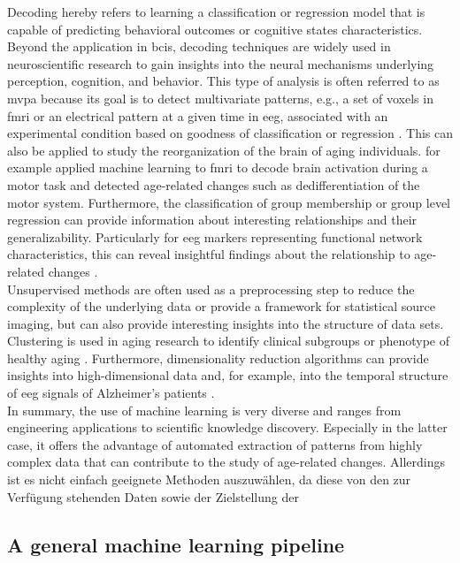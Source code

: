 Decoding hereby refers to learning a classification or regression model that is capable of predicting behavioral outcomes or cognitive states characteristics. Beyond the application in \glspl{bci}, decoding techniques are widely used in neuroscientific research to gain insights into the neural mechanisms underlying perception, cognition, and behavior. This type of analysis is often referred to as \gls{mvpa} because its goal is to detect multivariate patterns, e.g., a set of voxels in \gls{fmri} or an electrical pattern at a given time in \gls{eeg}, associated with an experimental condition based on goodness of classification or regression \cite{Holdgraf2017}. This can also be applied to study the reorganization of the brain of aging individuals. \cite{Carb2011} for example applied machine learning to \gls{fmri} to decode brain activation during a motor task and detected age-related changes such as dedifferentiation of the motor system. Furthermore, the classification of group membership or group level regression can provide information about interesting relationships and their generalizability. Particularly for \gls{eeg} markers representing functional network characteristics, this can reveal insightful findings about the relationship to age-related changes \cite{Petti2016}.\\
Unsupervised methods are often used as a preprocessing step to reduce the complexity of the underlying data or provide a framework for statistical source imaging, but can also provide interesting insights into the structure of data sets. Clustering is used in aging research to identify clinical subgroups or phenotype of healthy aging \cite{Marron2019}. Furthermore, dimensionality reduction algorithms can provide insights into high-dimensional data and, for example, into the temporal structure of \gls{eeg} signals of Alzheimer's patients \cite{Smailovic2019}.\\
In summary, the use of machine learning is very diverse and ranges from engineering applications to scientific knowledge discovery. Especially in the latter case, it offers the advantage of automated extraction of patterns from highly complex data that can contribute to the study of age-related changes. 
Allerdings ist es nicht einfach geeignete Methoden auszuwählen, da diese von den zur Verfügung stehenden Daten sowie der Zielstellung der 

\subsection{A general machine learning pipeline}





